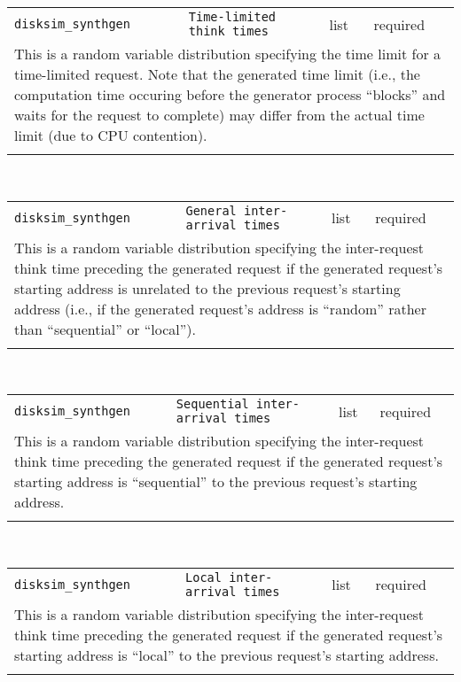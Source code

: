 \noindent 
\begin{tabular}{|p{\lpmodwidth}|p{\lpnamewidth}|p{0.5in}|p{0.5in}|}
\cline{1-4}
\texttt{disksim\_synthgen} & \texttt{Time-limited think times} & list & required \\ 
\cline{1-4}
\multicolumn{4}{|p{6in}|}{
This is a random variable distribution specifying the time limit for a
time-limited request. Note that the generated time limit (i.e., the
computation time occuring before the generator process ``blocks'' and
waits for the request to complete) may differ from the actual time
limit (due to CPU contention).
}\\ 
\cline{1-4}
\multicolumn{4}{p{5in}}{}\\
\end{tabular}\\ 
\noindent 
\begin{tabular}{|p{\lpmodwidth}|p{\lpnamewidth}|p{0.5in}|p{0.5in}|}
\cline{1-4}
\texttt{disksim\_synthgen} & \texttt{General inter-arrival times} & list & required \\ 
\cline{1-4}
\multicolumn{4}{|p{6in}|}{
This is a random variable distribution specifying the inter-request think time
preceding the generated request if the generated request's starting
address is unrelated to the previous request's starting address (i.e.,
if the generated request's address is ``random'' rather than
``sequential'' or ``local'').
}\\ 
\cline{1-4}
\multicolumn{4}{p{5in}}{}\\
\end{tabular}\\ 
\noindent 
\begin{tabular}{|p{\lpmodwidth}|p{\lpnamewidth}|p{0.5in}|p{0.5in}|}
\cline{1-4}
\texttt{disksim\_synthgen} & \texttt{Sequential inter-arrival times} & list & required \\ 
\cline{1-4}
\multicolumn{4}{|p{6in}|}{
This is a random variable distribution specifying the inter-request think
time preceding the generated request if the generated request's
starting address is ``sequential'' to the previous request's starting
address.
}\\ 
\cline{1-4}
\multicolumn{4}{p{5in}}{}\\
\end{tabular}\\ 
\noindent 
\begin{tabular}{|p{\lpmodwidth}|p{\lpnamewidth}|p{0.5in}|p{0.5in}|}
\cline{1-4}
\texttt{disksim\_synthgen} & \texttt{Local inter-arrival times} & list & required \\ 
\cline{1-4}
\multicolumn{4}{|p{6in}|}{
This is a random variable distribution specifying the inter-request think time
preceding the generated request if the generated request's starting
address is ``local'' to the previous request's starting address.
}\\ 
\cline{1-4}
\multicolumn{4}{p{5in}}{}\\
\end{tabular}\\ 
